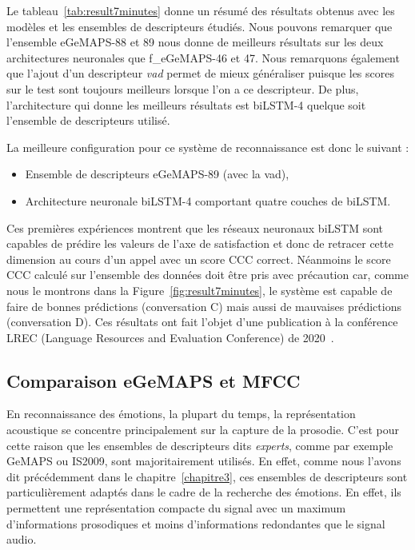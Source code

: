 

Le tableau~\ref{tab:result7minutes} donne un résumé des résultats obtenus avec les modèles et les ensembles de descripteurs étudiés.
Nous pouvons remarquer que l'ensemble eGeMAPS-88 et 89 nous donne de meilleurs résultats sur les deux architectures neuronales que f\_eGeMAPS-46 et 47. Nous remarquons également que l'ajout d'un descripteur \textit{vad} permet de mieux généraliser puisque les scores sur le test sont toujours meilleurs lorsque l'on a ce descripteur. De plus, l'architecture qui donne les meilleurs résultats est biLSTM-4 quelque soit l'ensemble de descripteurs utilisé.

La meilleure configuration pour ce système de reconnaissance est donc le suivant :

\begin{itemize}
  \item Ensemble de descripteurs eGeMAPS-89 (avec la vad),
  \item Architecture neuronale biLSTM-4 comportant quatre couches de biLSTM.
\end{itemize}

Ces premières expériences montrent que les réseaux neuronaux biLSTM sont capables de prédire les valeurs de l'axe de satisfaction et donc de retracer cette dimension au cours d’un appel avec un score CCC correct. Néanmoins le score CCC calculé sur l'ensemble des données doit être pris avec précaution car, comme nous le montrons dans la Figure~\ref{fig:result7minutes}, le système est capable de faire de bonnes prédictions (conversation C) mais aussi de mauvaises prédictions (conversation D). Ces résultats ont fait l'objet d'une publication à la conférence LREC (Language Resources and Evaluation Conference) de 2020~\cite{Macary2020allosat}.



\subsection{Comparaison eGeMAPS et MFCC}
En reconnaissance des émotions, la plupart du temps, la représentation acoustique se concentre principalement sur la capture de la prosodie. C'est pour cette raison que les ensembles de descripteurs dits \textit{experts}, comme par exemple GeMAPS ou IS2009, sont majoritairement utilisés. En effet, comme nous l'avons dit précédemment dans le chapitre~\ref{chapitre3}, ces ensembles de descripteurs sont particulièrement adaptés dans le cadre de la recherche des émotions. En effet, ils permettent une représentation compacte du signal avec un maximum d'informations prosodiques et moins d'informations redondantes que le signal audio.


